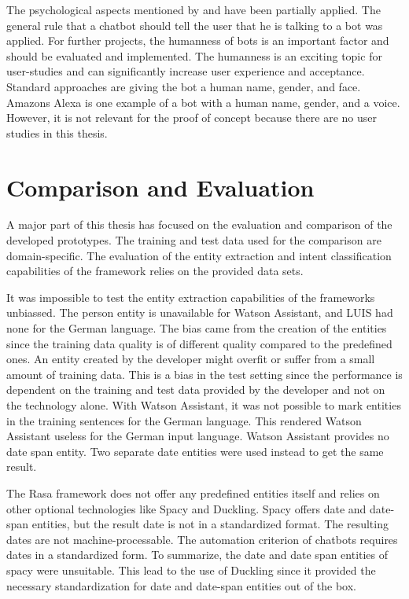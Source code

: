 The psychological aspects mentioned by \citet{folstad2017chatbots, brandtzaeg2018chatbots} and \citet{GO2019304} have been partially applied.
The general rule that a chatbot should tell the user that he is talking to a bot was applied.
For further projects, the humanness of bots is an important factor and should be evaluated and implemented.
The humanness is an exciting topic for user-studies and can significantly increase user experience and acceptance.
Standard approaches are giving the bot a human name, gender, and face.
Amazons Alexa is one example of a bot with a human name, gender, and a voice.
However, it is not relevant for the proof of concept because there are no user studies in this thesis.


\section{Comparison and Evaluation}\label{sec:comparison_and_eval}
A major part of this thesis has focused on the evaluation and comparison of the developed prototypes.
The training and test data used for the comparison are domain-specific. 
The evaluation of the entity extraction and intent classification capabilities of the framework relies on the provided data sets.

It was impossible to test the entity extraction capabilities of the frameworks unbiassed.
The person entity is unavailable for Watson Assistant, and LUIS had none for the German language.
The bias came from the creation of the entities since the training data quality is of different quality compared to the predefined ones.
An entity created by the developer might overfit or suffer from a small amount of training data.
This is a bias in the test setting since the performance is dependent on the training and test data provided by the developer and not on the technology alone.
With Watson Assistant, it was not possible to mark entities in the training sentences for the German language.
This rendered Watson Assistant useless for the German input language.
Watson Assistant provides no date span entity.
Two separate date entities were used instead to get the same result.
  
The Rasa framework does not offer any predefined entities itself and relies on other optional technologies like Spacy and Duckling.
Spacy offers date and date-span entities, but the result date is not in a standardized format.
The resulting dates are not machine-processable.
The automation criterion of chatbots requires dates in a standardized form.
To summarize, the date and date span entities of spacy were unsuitable.
This lead to the use of Duckling since it provided the necessary standardization for date and date-span entities out of the box.

